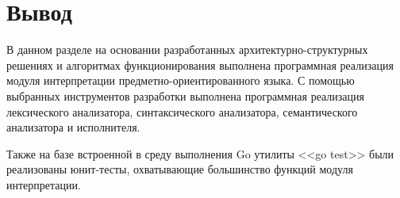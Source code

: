 





\section*{Вывод}

В данном разделе на основании разработанных архитектурно-структурных решениях и алгоритмах функционирования выполнена программная реализация модуля интерпретации предметно-ориентированного языка.
С помощью выбранных инструментов разработки выполнена программная реализация лексического анализатора, синтаксического анализатора, семантического анализатора и исполнителя.

Также на базе встроенной в среду выполнения Go утилиты <<go test>> были реализованы юнит-тесты, охватывающие большинство функций модуля интерпретации.